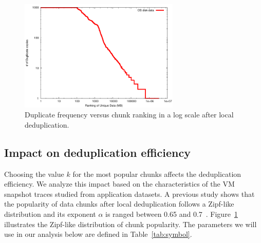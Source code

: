 \begin{figure}
\centering
 \includegraphics[width=3in]{figures/log-log-disk}
\caption{Duplicate frequency versus  chunk ranking in a log scale after local deduplication.}
\label{fig:Datazipf}
\end{figure}


\subsection{Impact on deduplication efficiency}
Choosing the value $k$ for the most popular chunks affects the deduplication efficiency.
We analyze this impact based on the characteristics  of the VM snapshot traces
studied from  application datasets.
A previous study shows that the popularity of data chunks after local deduplication follows 
a Zipf-like distribution\cite{Breslau1999a} and its
exponent $\alpha$ is ranged between 0.65  and  0.7~\cite{WeiZhangIEEE}. 
Figure~\ref{fig:Datazipf} illustrates the Zipf-like distribution of chunk popularity.
The parameters we will use in our analysis below are defined in
Table~\ref{tab:symbol}. 

